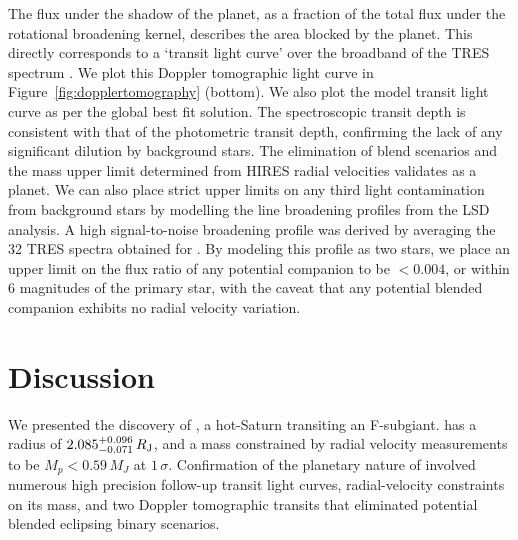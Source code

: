\documentclass[apjl]{emulateapj}
\newcommand{\rjup}{\ensuremath{R_{\rm J}}}
\newcommand{\genevaplanetradius}{\ensuremath{2.085_{-0.071}^{+0.096}}}                 %
\begin{document}
The flux under the shadow of the planet, as a fraction of the total flux under the rotational broadening kernel, describes the area blocked by the planet. This directly corresponds to a `transit light curve' over the broadband of the TRES spectrum \citep[following][]{Zhou:2016}. We plot this Doppler tomographic light curve in Figure~\ref{fig:dopplertomography} (bottom). We also plot the model transit light curve as per the global best fit solution. The spectroscopic transit depth is consistent with that of the photometric transit depth, confirming the lack of any significant dilution by background stars. The elimination of blend scenarios and the mass upper limit determined from HIRES radial velocities validates \hatcurb{} as a planet. We can also place strict upper limits on any third light contamination from background stars by modelling the line broadening profiles from the LSD analysis. A high signal-to-noise broadening profile was derived by averaging the 32 TRES spectra obtained for \hatcur{}. By modeling this profile as two stars, we place an upper limit on the flux ratio of any potential companion to be $<0.004$, or within 6 magnitudes of the primary star, with the caveat that any potential blended companion exhibits no radial velocity variation.


\section{Discussion}
\label{sec:discussion}

We presented the discovery of \hatcurb{}, a hot-Saturn transiting an F-subgiant. \hatcurb{} has a radius of $\genevaplanetradius\,\rjup$, and a mass constrained by radial velocity measurements to be $M_p < 0.59\,M_J$ at $1\,\sigma$. Confirmation of the planetary nature of \hatcurb{} involved numerous high precision follow-up transit light curves, radial-velocity constraints on its mass, and two Doppler tomographic transits that eliminated potential blended eclipsing binary scenarios. 
\end{document}
